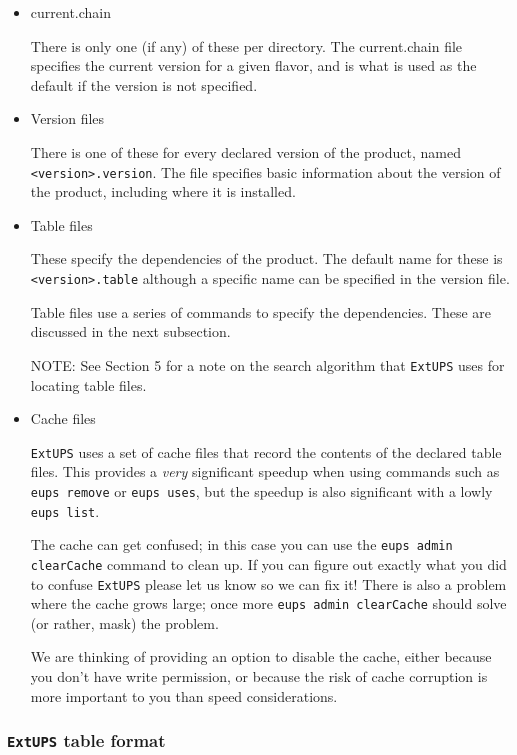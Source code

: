 \documentclass{article}
\newcommand{\code}[1]{\texttt{#1}}
\newcommand{\file}[1]{\texttt{#1}}
\newcommand{\eups}{\code{ExtUPS}\xspace}
\begin{document}
\begin{itemize}
  \item current.chain

    There is only one (if any) of these per directory.  The
    current.chain file specifies the current version for a given
    flavor, and is what is used as the default if the version is not
    specified.

  \item Version files

    There is one of these for every declared version of the product,
    named \file{<version>.version}. The file specifies basic information
    about the version of the product, including where it is installed.

  \item Table files

    These specify the dependencies of the product. The default name
    for these is \file{<version>.table} although a specific name can be specified in the
    version file.

    Table files use a series of commands to specify the dependencies. These are
    discussed in the next subsection.

    NOTE: See Section 5 for a note on the search algorithm that \eups uses for
    locating table files.

  \item Cache files

    \eups uses a set of cache files that record the contents of the declared
    table files.  This provides a \emph{very} significant speedup when using
    commands such as \code{eups remove} or \code{eups uses}, but the speedup
    is also significant with a lowly \code{eups list}.

    The cache can get confused; in this case you can use the \code{eups admin clearCache}
    command to clean up.  If you can figure out exactly what you did to confuse
    \eups please let us know so we can fix it!  There is also a problem where
    the cache grows large;  once more \code{eups admin clearCache} should
    solve (or rather, mask) the problem.

    We are thinking of providing an option to disable the cache, either because
    you don't have write permission, or because the risk of cache corruption is
    more important to you than speed considerations.
\end{itemize}

\subsubsection{\eups table format}
\end{document}
